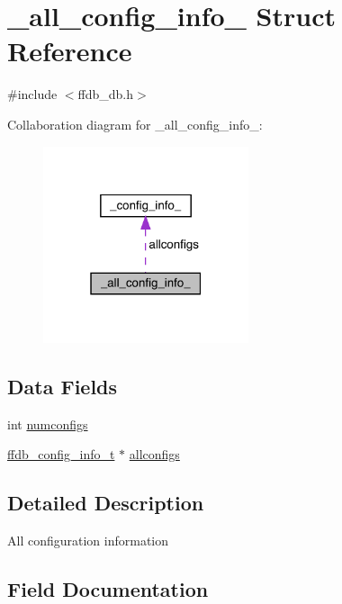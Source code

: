 \hypertarget{struct__all__config__info__}{}\section{\+\_\+all\+\_\+config\+\_\+info\+\_\+ Struct Reference}
\label{struct__all__config__info__}


{\ttfamily \#include $<$ffdb\+\_\+db.\+h$>$}



Collaboration diagram for \+\_\+all\+\_\+config\+\_\+info\+\_\+\+:\nopagebreak
\begin{figure}[H]
\begin{center}
\leavevmode
\includegraphics[width=171pt]{d5/d68/struct__all__config__info____coll__graph}
\end{center}
\end{figure}
\subsection*{Data Fields}
\begin{DoxyCompactItemize}
\item 
int \mbox{\hyperlink{struct__all__config__info___a581857c25b21cf9e4b7f87396aefca30}{numconfigs}}
\item 
\mbox{\hyperlink{adat-devel_2other__libs_2filedb_2filehash_2ffdb__db_8h_acc961fbd2faf6a849a1620309100fda1}{ffdb\+\_\+config\+\_\+info\+\_\+t}} $\ast$ \mbox{\hyperlink{struct__all__config__info___af6ab66605d28fe7af72fb69c4fe61a40}{allconfigs}}
\end{DoxyCompactItemize}


\subsection{Detailed Description}
All configuration information 

\subsection{Field Documentation}
\mbox{\label{struct__all__config__info___af6ab66605d28fe7af72fb69c4fe61a40}} 
